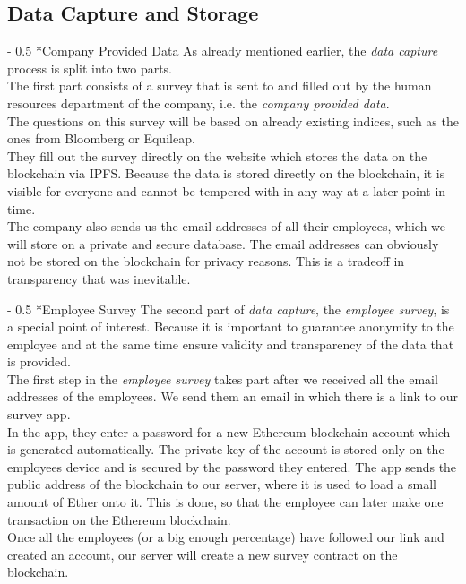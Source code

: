 \documentclass[portrait,a4paper]{article}
\makeatletter
\renewcommand\paragraph{\@startsection{paragraph}{4}{0mm}%
	{-\baselineskip}%
	{0.5\baselineskip}%
	{\normalfont\bfseries}%
}%
\makeatother
\begin{document}
	\subsection{Data Capture and Storage}
		\paragraph*{Company Provided Data}
			As already mentioned earlier, the \textit{data capture} process is split into two parts.\\
			The first part consists of a survey that is sent to and filled out by the human resources 
			department of the company, i.e. the \textit{company provided data}.\\
			The questions on this survey will be based on already existing indices, 
			such as the ones from Bloomberg or Equileap.\\
			They fill out the survey directly on the website which stores the data on the blockchain via IPFS. 
			Because the data is stored directly on the blockchain, it is visible for everyone and 
			cannot be tempered with in any way at a later point in time.\\
			The company also sends us the email addresses of all their employees, which we will store 
			on a private and secure database. The email addresses can obviously not be stored on the 
			blockchain for privacy reasons. This is a tradeoff in transparency that was inevitable.

		\paragraph*{Employee Survey}
			The second part of \textit{data capture}, the \textit{employee survey}, is a special point of interest. 
			Because it is important to guarantee anonymity to the employee and at the same time ensure 
			validity and transparency of the data that is provided.\\

			The first step in the \textit{employee survey} takes part after we received all the email 
			addresses of the employees. We send them an email in which there is a link to our survey app.\\
			In the app, they enter a password for a new Ethereum blockchain account which is 
			generated automatically. The private key of the account is stored only on the 
			employees device and is secured by the password they entered. The app sends the public address of the 
			blockchain to our server, where it is used to load a small amount of Ether onto it. 
			This is done, so that the employee can later make one transaction on the Ethereum blockchain.\\
			Once all the employees (or a big enough percentage) have followed our link and created an account, 
			our server will create a new survey contract on the blockchain.\\
\end{document}
